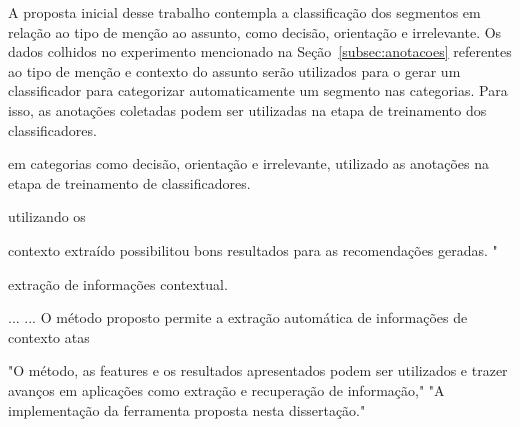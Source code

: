 A proposta inicial desse trabalho contempla a classificação dos segmentos em relação ao tipo de menção ao assunto, como decisão, orientação e irrelevante. Os dados colhidos no experimento mencionado na Seção~\ref{subsec:anotacoes} referentes ao tipo de menção e contexto do assunto serão utilizados para o gerar um classificador para categorizar automaticamente um segmento nas categorias. Para isso, as anotações coletadas podem ser utilizadas na etapa de treinamento dos classificadores.


em categorias como decisão, orientação e irrelevante, utilizado as anotações na etapa de treinamento de classificadores.





utilizando os 



















contexto extraído possibilitou bons resultados para as recomendações geradas. "



extração de informações contextual. 


















...
...
O método proposto permite a extração automática de informações de contexto atas



	"O método, as features e os resultados apresentados podem ser utilizados e trazer avanços em aplicações como extração e recuperação de informação,"
	"A implementação da ferramenta proposta nesta dissertação."







